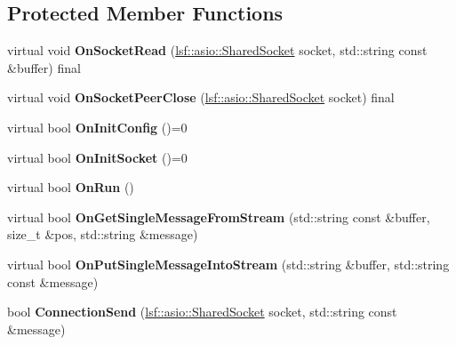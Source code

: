 \subsection*{Protected Member Functions}
\begin{DoxyCompactItemize}
\item 
\hypertarget{classBasicService_a5af0f9a44e4ac2e3d093e6fa4d1de9bd}{
virtual void {\bfseries OnSocketRead} (\hyperlink{classlsf_1_1asio_1_1SharedSocket}{lsf::asio::SharedSocket} socket, std::string const \&buffer) final}
\label{classBasicService_a5af0f9a44e4ac2e3d093e6fa4d1de9bd}

\item 
\hypertarget{classBasicService_abf3472ca50f029861d96a54463b103fc}{
virtual void {\bfseries OnSocketPeerClose} (\hyperlink{classlsf_1_1asio_1_1SharedSocket}{lsf::asio::SharedSocket} socket) final}
\label{classBasicService_abf3472ca50f029861d96a54463b103fc}

\item 
\hypertarget{classBasicService_aace9f1be5c779d40d478f0a388369d49}{
virtual bool {\bfseries OnInitConfig} ()=0}
\label{classBasicService_aace9f1be5c779d40d478f0a388369d49}

\item 
\hypertarget{classBasicService_af61c5129b1341092f8cf9e3ae16e7997}{
virtual bool {\bfseries OnInitSocket} ()=0}
\label{classBasicService_af61c5129b1341092f8cf9e3ae16e7997}

\item 
\hypertarget{classBasicService_a40ea9f4c667a55dffa2ebc5318b666a3}{
virtual bool {\bfseries OnRun} ()}
\label{classBasicService_a40ea9f4c667a55dffa2ebc5318b666a3}

\item 
\hypertarget{classBasicService_af67f5e983a0620f1a4f34ecf56df6e41}{
virtual bool {\bfseries OnGetSingleMessageFromStream} (std::string const \&buffer, size\_\-t \&pos, std::string \&message)}
\label{classBasicService_af67f5e983a0620f1a4f34ecf56df6e41}

\item 
\hypertarget{classBasicService_ada3cdb2963839d5fa75173212a7266d4}{
virtual bool {\bfseries OnPutSingleMessageIntoStream} (std::string \&buffer, std::string const \&message)}
\label{classBasicService_ada3cdb2963839d5fa75173212a7266d4}

\item 
\hypertarget{classBasicService_ada73131c8149a3d43b5c18ffee01c5ea}{
bool {\bfseries ConnectionSend} (\hyperlink{classlsf_1_1asio_1_1SharedSocket}{lsf::asio::SharedSocket} socket, std::string const \&message)}
\label{classBasicService_ada73131c8149a3d43b5c18ffee01c5ea}


\end{DoxyCompactItemize}
